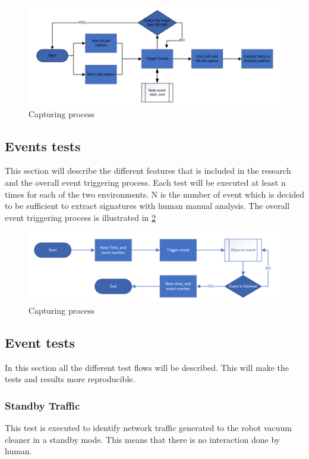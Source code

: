 \begin{figure}[H]
    \centering
    \includegraphics[width=\textwidth]{figures/Event triggering process.png}
    \caption{Capturing process}
    \label{fig:captuingprocess}
\end{figure}

\subsection{Events tests}
This section will describe the different features that is included in the research and the overall event triggering process. Each test will be executed at least n times for each of the two environments. N is the number of event which is decided to be sufficient to extract signatures with human manual analysis. The overall event triggering process is illustrated in \ref{fig:EventTriggeringProcess}

\begin{figure}[H]
    \centering
    \includegraphics[width=\textwidth]{figures/EventTriggeringProcess.png}
    \caption{Capturing process}
    \label{fig:EventTriggeringProcess}
\end{figure}

\subsection{Event tests}
In this section all the different test flows will be described. This will make the tests and results more reproducible. 

\subsubsection{Standby Traffic}
This test is executed to identify network traffic generated to the robot vacuum cleaner in a standby mode. This means that there is no interaction done by human. 

